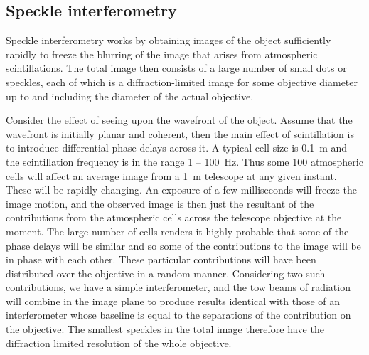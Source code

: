 \subsection{Speckle interferometry}

Speckle interferometry works by obtaining images of the object sufficiently rapidly to freeze the blurring of the image that arises from atmospheric scintillations. The total image then consists of a large number of small dots or speckles, each of which is a diffraction-limited image for some objective diameter up to and including the diameter of the actual objective.

Consider the effect of seeing upon the wavefront of the object. Assume that the wavefront is initially planar and coherent, then the main effect of scintillation is to introduce differential phase delays across it. A typical cell size is 0.1~m and the scintillation frequency is in the range 1 -- 100~Hz. Thus some 100 atmospheric cells will affect an average image from a 1~m telescope at any given instant. These will be rapidly changing. An exposure of a few milliseconds will freeze the image motion, and the observed image is then just the resultant of the contributions from the atmospheric cells across the telescope objective at the moment. The large number of cells renders it highly probable that some of the phase delays will be similar and so some of the contributions to the image will be in phase with each other. These particular contributions will have been distributed over the objective in a random manner. Considering two such contributions, we have a simple interferometer, and the tow beams of radiation will combine in the image plane to produce results identical with those of an interferometer whose baseline is equal to the separations of the contribution on the objective. The smallest speckles in the total image therefore have the diffraction limited resolution of the whole objective. 
